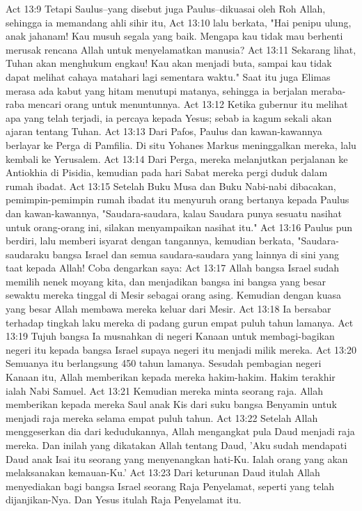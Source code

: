 Act 13:9  Tetapi Saulus--yang disebut juga Paulus--dikuasai oleh Roh Allah, sehingga ia memandang ahli sihir itu,
Act 13:10  lalu berkata, "Hai penipu ulung, anak jahanam! Kau musuh segala yang baik. Mengapa kau tidak mau berhenti merusak rencana Allah untuk menyelamatkan manusia?
Act 13:11  Sekarang lihat, Tuhan akan menghukum engkau! Kau akan menjadi buta, sampai kau tidak dapat melihat cahaya matahari lagi sementara waktu." Saat itu juga Elimas merasa ada kabut yang hitam menutupi matanya, sehingga ia berjalan meraba-raba mencari orang untuk menuntunnya.
Act 13:12  Ketika gubernur itu melihat apa yang telah terjadi, ia percaya kepada Yesus; sebab ia kagum sekali akan ajaran tentang Tuhan.
Act 13:13  Dari Pafos, Paulus dan kawan-kawannya berlayar ke Perga di Pamfilia. Di situ Yohanes Markus meninggalkan mereka, lalu kembali ke Yerusalem.
Act 13:14  Dari Perga, mereka melanjutkan perjalanan ke Antiokhia di Pisidia, kemudian pada hari Sabat mereka pergi duduk dalam rumah ibadat.
Act 13:15  Setelah Buku Musa dan Buku Nabi-nabi dibacakan, pemimpin-pemimpin rumah ibadat itu menyuruh orang bertanya kepada Paulus dan kawan-kawannya, "Saudara-saudara, kalau Saudara punya sesuatu nasihat untuk orang-orang ini, silakan menyampaikan nasihat itu."
Act 13:16  Paulus pun berdiri, lalu memberi isyarat dengan tangannya, kemudian berkata, "Saudara-saudaraku bangsa Israel dan semua saudara-saudara yang lainnya di sini yang taat kepada Allah! Coba dengarkan saya:
Act 13:17  Allah bangsa Israel sudah memilih nenek moyang kita, dan menjadikan bangsa ini bangsa yang besar sewaktu mereka tinggal di Mesir sebagai orang asing. Kemudian dengan kuasa yang besar Allah membawa mereka keluar dari Mesir.
Act 13:18  Ia bersabar terhadap tingkah laku mereka di padang gurun empat puluh tahun lamanya.
Act 13:19  Tujuh bangsa Ia musnahkan di negeri Kanaan untuk membagi-bagikan negeri itu kepada bangsa Israel supaya negeri itu menjadi milik mereka.
Act 13:20  Semuanya itu berlangsung 450 tahun lamanya. Sesudah pembagian negeri Kanaan itu, Allah memberikan kepada mereka hakim-hakim. Hakim terakhir ialah Nabi Samuel.
Act 13:21  Kemudian mereka minta seorang raja. Allah memberikan kepada mereka Saul anak Kis dari suku bangsa Benyamin untuk menjadi raja mereka selama empat puluh tahun.
Act 13:22  Setelah Allah menggeserkan dia dari kedudukannya, Allah mengangkat pula Daud menjadi raja mereka. Dan inilah yang dikatakan Allah tentang Daud, 'Aku sudah mendapati Daud anak Isai itu seorang yang menyenangkan hati-Ku. Ialah orang yang akan melaksanakan kemauan-Ku.'
Act 13:23  Dari keturunan Daud itulah Allah menyediakan bagi bangsa Israel seorang Raja Penyelamat, seperti yang telah dijanjikan-Nya. Dan Yesus itulah Raja Penyelamat itu.
